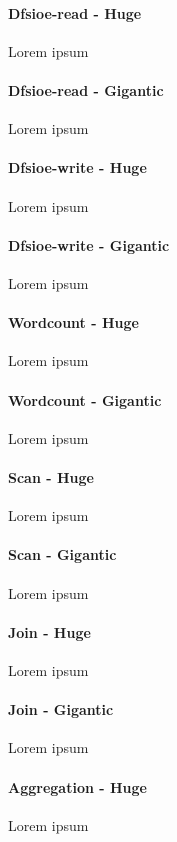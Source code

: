 \documentclass[review]{elsarticle}
\begin{document}
\paragraph{Dfsioe-read - Huge} Lorem ipsum

\paragraph{Dfsioe-read - Gigantic} Lorem ipsum

\paragraph{Dfsioe-write - Huge} Lorem ipsum

\paragraph{Dfsioe-write - Gigantic} Lorem ipsum

\paragraph{Wordcount - Huge} Lorem ipsum

\paragraph{Wordcount - Gigantic} Lorem ipsum

\paragraph{Scan - Huge} Lorem ipsum

\paragraph{Scan - Gigantic} Lorem ipsum

\paragraph{Join - Huge} Lorem ipsum

\paragraph{Join - Gigantic} Lorem ipsum

\paragraph{Aggregation - Huge} Lorem ipsum
\end{document}
